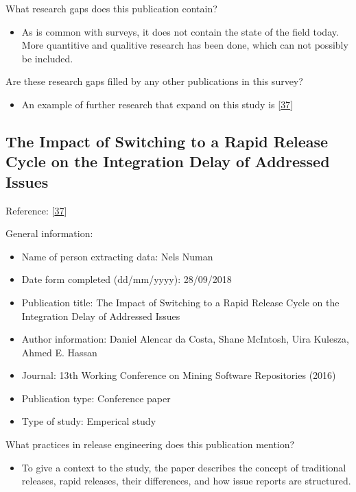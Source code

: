 \documentclass[]{book}
\providecommand{\tightlist}{%
  \setlength{\itemsep}{0pt}\setlength{\parskip}{0pt}}
\begin{document}
What research gaps does this publication contain?

\begin{itemize}
\tightlist
\item
  As is common with surveys, it does not contain the state of the field
  today. More quantitive and qualitive research has been done, which can
  not possibly be included.
\end{itemize}

Are these research gaps filled by any other publications in this survey?

\begin{itemize}
\tightlist
\item
  An example of further research that expand on this study is
  {[}\protect\hyperlink{ref-da2016a}{37}{]}
\end{itemize}

\subsection{The Impact of Switching to a Rapid Release Cycle on the
Integration Delay of Addressed
Issues}\label{the-impact-of-switching-to-a-rapid-release-cycle-on-the-integration-delay-of-addressed-issues}

Reference: {[}\protect\hyperlink{ref-da2016a}{37}{]}

General information:

\begin{itemize}
\tightlist
\item
  Name of person extracting data: Nels Numan
\item
  Date form completed (dd/mm/yyyy): 28/09/2018
\item
  Publication title: The Impact of Switching to a Rapid Release Cycle on
  the Integration Delay of Addressed Issues
\item
  Author information: Daniel Alencar da Costa, Shane McIntosh, Uira
  Kulesza, Ahmed E. Hassan
\item
  Journal: 13th Working Conference on Mining Software Repositories
  (2016)
\item
  Publication type: Conference paper
\item
  Type of study: Emperical study
\end{itemize}

What practices in release engineering does this publication mention?

\begin{itemize}
\tightlist
\item
  To give a context to the study, the paper describes the concept of
  traditional releases, rapid releases, their differences, and how issue
  reports are structured.
\end{itemize}
\end{document}

